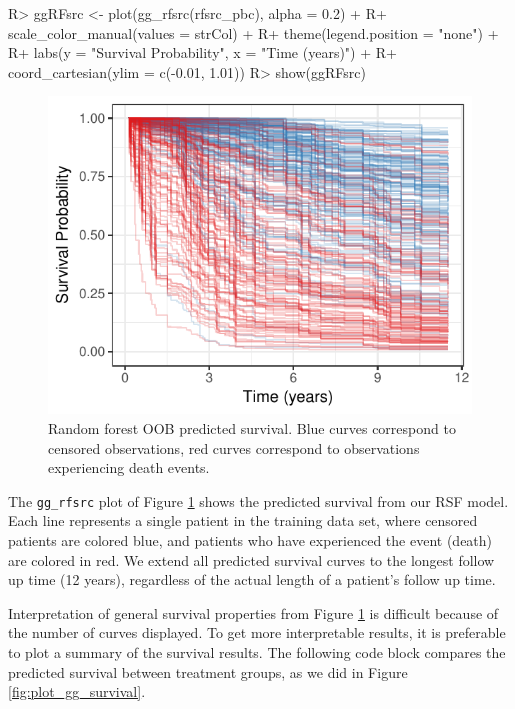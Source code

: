 \documentclass[article, nojss]{jss}
\begin{document}
\begin{Schunk}
\begin{Sinput}
R> ggRFsrc <- plot(gg_rfsrc(rfsrc_pbc), alpha = 0.2) +
R+   scale_color_manual(values = strCol) +
R+   theme(legend.position = "none") +
R+   labs(y = "Survival Probability", x = "Time (years)") +
R+   coord_cartesian(ylim = c(-0.01, 1.01))
R> show(ggRFsrc)
\end{Sinput}
\begin{figure}[!htb]

{\centering \includegraphics{rfs-rfsrc-plot-1}

}

\caption[Random forest OOB predicted survival]{Random forest OOB predicted survival. Blue curves correspond to censored observations, red curves correspond to observations experiencing death events.}\label{fig:rfsrc-plot}
\end{figure}
\end{Schunk}

The \texttt{gg\_rfsrc} plot of Figure \ref{fig:rfsrc-plot} shows the
predicted survival from our RSF model. Each line represents a single
patient in the training data set, where censored patients are colored
blue, and patients who have experienced the event (death) are colored in
red. We extend all predicted survival curves to the longest follow up
time (12 years), regardless of the actual length of a patient's follow
up time.

Interpretation of general survival properties from Figure
\ref{fig:rfsrc-plot} is difficult because of the number of curves
displayed. To get more interpretable results, it is preferable to plot a
summary of the survival results. The following code block compares the
predicted survival between treatment groups, as we did in Figure
\ref{fig:plot_gg_survival}.
\end{document}
